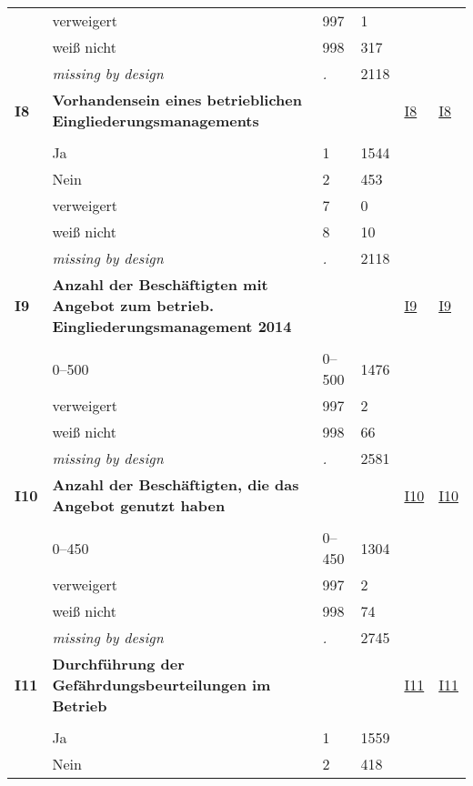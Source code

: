\begin{longtable}{| L{2.45cm} | L{6cm} | C{1.5cm} | R{1cm} | C{2.25cm} | C{2.25cm} |}
   & verweigert & 997 & 1 &  &  \\ 
   & weiß nicht & 998 & 317 &  &  \\ 
   & \textit{missing by design} & \textit{.} & 2118 &  &  \\ 
   \midrule
\textbf{I8}\label{var:I8} & \textbf{Vorhandensein eines betrieblichen Eingliederungsmanagements} &  &  & \hyperref[I8]{I8} & \hyperref[var:suf:I8]{I8} \\ 
   &  &  &  &  &  \\ 
   & Ja & 1 & 1544 &  &  \\ 
   & Nein & 2 & 453 &  &  \\ 
   & verweigert & 7 & 0 &  &  \\ 
   & weiß nicht & 8 & 10 &  &  \\ 
   & \textit{missing by design} & \textit{.} & 2118 &  &  \\ 
   \midrule
\textbf{I9}\label{var:I9} & \textbf{Anzahl der Beschäftigten mit Angebot zum betrieb. Eingliederungsmanagement 2014} &  &  & \hyperref[I9]{I9} & \hyperref[var:suf:I9]{I9} \\ 
   &  &  &  &  &  \\ 
   & 0--500 & 0--500 & 1476 &  &  \\ 
   & verweigert & 997 & 2 &  &  \\ 
   & weiß nicht & 998 & 66 &  &  \\ 
   & \textit{missing by design} & \textit{.} & 2581 &  &  \\ 
   \midrule
\textbf{I10}\label{var:I10} & \textbf{Anzahl der Beschäftigten, die das Angebot genutzt haben} &  &  & \hyperref[I10]{I10} & \hyperref[var:suf:I10]{I10} \\ 
   &  &  &  &  &  \\ 
   & 0--450 & 0--450 & 1304 &  &  \\ 
   & verweigert & 997 & 2 &  &  \\ 
   & weiß nicht & 998 & 74 &  &  \\ 
   & \textit{missing by design} & \textit{.} & 2745 &  &  \\ 
   \midrule
\textbf{I11}\label{var:I11} & \textbf{Durchführung der Gefährdungsbeurteilungen im Betrieb} &  &  & \hyperref[I11]{I11} & \hyperref[var:suf:I11]{I11} \\ 
   &  &  &  &  &  \\ 
   & Ja & 1 & 1559 &  &  \\ 
   & Nein & 2 & 418 &  &  \\ 

\end{longtable}
